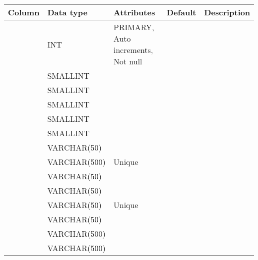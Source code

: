 \documentclass[letterpaper,10pt,english]{sphinxmanual}
\begin{document}
\begin{savenotes}\sphinxattablestart
\centering
\begin{tabulary}{\linewidth}[t]{|T|T|T|T|T|}
\hline
\sphinxstyletheadfamily 
Column
&\sphinxstyletheadfamily 
Data type
&\sphinxstyletheadfamily 
Attributes
&\sphinxstyletheadfamily 
Default
&\sphinxstyletheadfamily 
Description
\\
\hline
{}
&
INT
&
PRIMARY, Auto increments, Not null
&&\\
\hline
{}
&
SMALLINT
&&
&\\
\hline
{}
&
SMALLINT
&&
&\\
\hline
{}
&
SMALLINT
&&
&\\
\hline
{}
&
SMALLINT
&&
&\\
\hline
{}
&
SMALLINT
&&
&\\
\hline
{}
&
VARCHAR(50)
&&
&\\
\hline
{}
&
VARCHAR(500)
&
Unique
&
&\\
\hline
{}
&
VARCHAR(50)
&&
&\\
\hline
{}
&
VARCHAR(50)
&&
&\\
\hline
{}
&
VARCHAR(50)
&
Unique
&
&\\
\hline
{}
&
VARCHAR(50)
&&
&\\
\hline
{}
&
VARCHAR(500)
&&
&\\
\hline
{}
&
VARCHAR(500)
&&
&\\
\hline
\end{tabulary}
\par
\sphinxattableend\end{savenotes}
\end{document}
